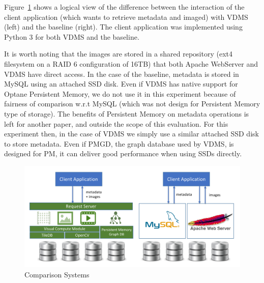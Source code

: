 Figure~\ref{fig:systems} shows a logical view of the difference between the
interaction of the client application (which wants to retrieve metadata and
imaged) with VDMS (left) and the baseline (right).
The client application was implemented using Python 3 for both VDMS and
the baseline.

It is worth noting that the images are stored in a shared repository
(ext4 filesystem on a RAID 6 configuration of 16TB) that both Apache WebServer
and VDMS have direct access. In the case of the baseline, metadata is
stored in MySQL using an attached SSD disk.
Even if VDMS has native support for Optane Persistent Memory,
we do not use it in this experiment because of fairness of comparison w.r.t
MySQL (which was not design for Persistent Memory type of storage).
The benefits of Persistent Memory on metadata operations is left
for another paper, and outside the scope of this evaluation.
For this experiment then, in the case of VDMS we simply use a similar
attached SSD disk to store metadata.
Even if PMGD, the graph database used by VDMS, is designed for PM,
it can deliver good performance when using SSDs directly.

\begin{figure}[]
\centering
\includegraphics[width=\textwidth]{figures/comparison_system}
\caption{Comparison Systems}
\label{fig:systems}
\end{figure}

